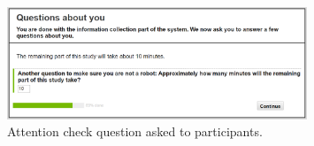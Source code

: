 \begin{figure}
	\centering
	\includegraphics[width=0.8\textwidth]{figures/time.PNG}
	\caption{Attention check question asked to participants.}
	\label{fig:attn_time}
\end{figure}

%
%
%
%
%
%
%
%
%
